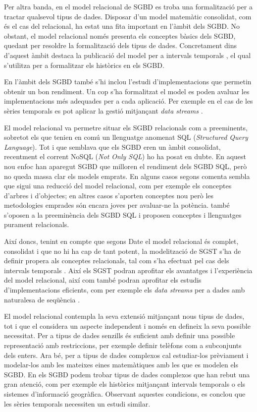 Per altra banda, en el model relacional de SGBD es troba una
formalització per a tractar qualsevol tipus de dades. Disposar d'un
model matemàtic consolidat, com és el cas del relacional, ha estat una
fita important en l'àmbit dels SGBD.  No obstant, el model relacional
només presenta els conceptes bàsics dels SGBD, quedant per resoldre la
formalització dels tipus de dades. Concretament dins d'aquest àmbit
destaca la publicació del model per a intervals
temporals \parencite{date02:_tempor_data_relat_model}, el qual
s'utilitza per a formalitzar els històrics en els SGBD.

En l'àmbit dels SGBD també s'hi inclou l'estudi d'implementacions que
permetin obtenir un bon rendiment. Un cop s'ha formalitzat el model es
poden avaluar les implementacions més adequades per a cada
aplicació. Per exemple en el cas de les sèries temporals es pot
aplicar la gestió mitjançant \emph{data
  streams} \parencite{babcock02}.


El model relacional \parencite{codd70} va permetre situar els SGBD
relacionals com a preeminents, sobretot els que tenien en comú un
llenguatge anomenat SQL (\emph{Structured Query Language}). Tot i que
semblava que els SGBD eren un àmbit consolidat, recentment el corrent
NoSQL (\emph{Not Only SQL}) \parencite{edlich:nosql,stonebraker10} ho
ha posat en dubte.  En aquest nou enfoc han aparegut SGBD que milloren
el rendiment dels SGBD SQL, però no queda massa clar els models
emprats. En alguns casos segons comenta \textcite[cap.~14,27]{date06}
sembla que sigui una reducció del model relacional, com per exemple
els conceptes d'arbres i d'objectes; en altres casos s'aporten
conceptes nou però les metodologies emprades són encara joves per
avaluar-ne la potència. \textcite{date:thethirdmanifesto} també
s'oposen a la preeminència dels SGBD SQL i proposen conceptes i
llenguatges purament relacionals.




Així doncs, tenint en compte que segons Date el model relacional és
complet, consolidat i que no hi ha cap de tant potent, la modelització
de SGST s'ha de definir propera als conceptes relacionals, tal com
s'ha efectuat pel cas dels intervals
temporals \parencite{date02:_tempor_data_relat_model}. Així els SGST
podran aprofitar els avantatges i l'experiència del model relacional,
així com també podran aprofitar els estudis d'implementacions
eficients, com per exemple els \emph{data streams} per a dades amb
naturalesa de seqüència \parencite{bai05}.

El model relacional contempla la seva extensió mitjançant nous tipus
de dades, tot i que el considera un aspecte independent i només en
defineix la seva possible necessitat. Per a tipus de dades senzills és
suficient amb definir una possible representació amb restriccions, per
exemple definir telèfons com a subconjunts dels enters. Ara bé, per a
tipus de dades complexos cal estudiar-los prèviament i modelar-los amb
les mateixes eines matemàtiques amb les que es modelen els SGBD.  En
els SGBD podem trobar tipus de dades complexos que han rebut una gran
atenció, com per exemple els històrics mitjançant intervals temporals
o els sistemes d'informació geogràfica. Observant aquestes condicions,
es conclou que les sèries temporals necessiten un estudi similar.

